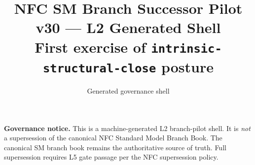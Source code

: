 \documentclass[11pt]{article}
\title{NFC SM Branch Successor Pilot\\[0.5ex]
  \large v30 --- L2 Generated Shell\\[0.5ex]
  \normalsize First exercise of \texttt{intrinsic-structural-close} posture}
\author{Generated governance shell}
\date{}
\begin{document}
\maketitle
\tableofcontents
\bigskip
\noindent\textbf{Governance notice.} This is a machine-generated L2 branch-pilot
shell. It is \emph{not} a supersession of the canonical NFC Standard Model Branch
Book. The canonical SM branch book remains the authoritative source of truth.
Full supersession requires L5 gate passage per the NFC supersession policy.
\vspace{1em}

\end{document}
